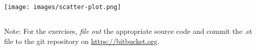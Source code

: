 \documentclass [11pt, a4wide, twoside]{article}
\begin{document}
\vspace{1cm}

\texttt{[image: images/scatter-plot.png]}

\subsection*{}
Note: For the exercises, {\em file out} the appropriate source code and commit the .st file to the git repository on \href{https://bitbucket.org}{https://bitbucket.org}.
\end{document}
